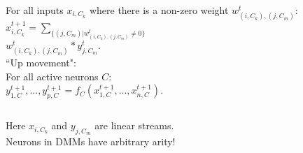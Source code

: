 \documentclass{beamer}
\begin{document}
\begin{frame}
{\begin{columns}[T]
\begin{column}{0.3\textwidth}
{For all inputs $x_{i,C_k}$ where there is a non-zero weight $w_{(i,C_k), (j,C_m)}^t$:\\[1ex]

{\scriptsize$x_{i,C_k}^{t+1} = \sum_{\{(j,C_m) | w_{(i,C_k), (j,C_m)}^t \neq 0\}}$\\[0.1ex]$w_{(i,C_k), (j,C_m)}^t * y_{j, C_m}^{t}.$}\\[3ex]

``Up movement":\\[0.1ex]  

For all active neurons $C$:\\[1ex]

{\scriptsize $y^{t+1}_{1,C},...,y^{t+1}_{p,C} = f_C (x^{t+1}_{1,C},...,x^{t+1}_{n,C})$.}
}

\end{column}
\end{columns}


Here $x_{i,C_k}$ and $y_{j,C_m}$ are linear streams.\\
Neurons in DMMs have arbitrary arity!
}

\end{frame}
\end{document}

